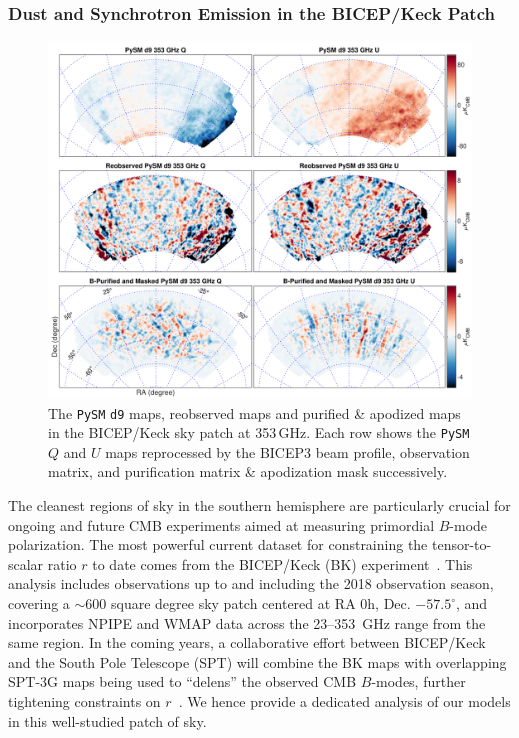 \documentclass[twocolumn]{aastex631}
\begin{document}
\subsubsection{Dust and Synchrotron Emission in the BICEP/Keck Patch}
\label{sec:BK_validation}
\begin{figure}
    \centering
    \includegraphics[width=2.\columnwidth]{figures/pysm_d9_353_delta_reobs_B_pub.pdf}
    \caption{The \texttt{PySM} \texttt{d9} maps, reobserved maps and purified \& apodized maps in the BICEP/Keck sky patch at 353\,GHz. Each row shows the
    \texttt{PySM} $Q$ and $U$ maps reprocessed by the BICEP3 beam profile, observation matrix, and purification matrix \& apodization mask successively.}
    \label{fig:psym_BKmatrix}
\end{figure}

The cleanest regions of sky in the southern hemisphere are particularly crucial for ongoing and future CMB experiments aimed at measuring primordial $B$-mode polarization. The most powerful current dataset for constraining the tensor-to-scalar ratio $r$ to date comes from the BICEP/Keck (BK) experiment~\citep[][henceforth ``BK18'']{Ade:2021}. This analysis includes observations up to and including the 2018 observation season, covering a $\sim 600$ square degree sky patch centered at RA 0h, Dec. $-57.5^{\circ}$, and incorporates NPIPE and WMAP data across the 23--353~GHz range from the same region. In the coming years, a collaborative effort between BICEP/Keck and the South Pole Telescope (SPT) will combine the BK maps with overlapping SPT-3G maps being used to ``delens'' the observed CMB $B$-modes, further tightening constraints on $r$~\citep{TheBICEP/KeckCollaboration:2024}. We hence provide a dedicated analysis of our models in this well-studied patch of sky. 
\end{document}
